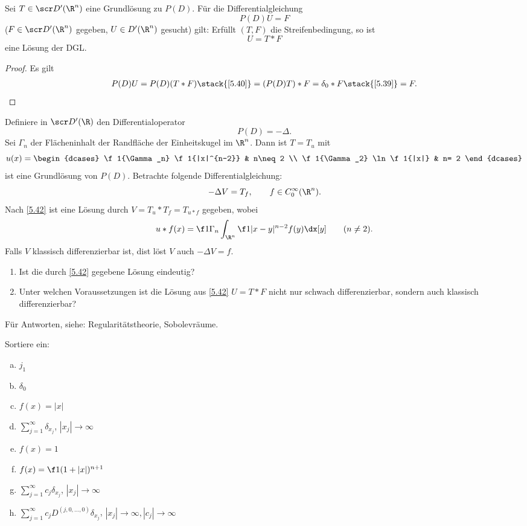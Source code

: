 \begin{st} \label{5.42}
	Sei $T \in \scr D'(\R^n)$ eine Grundlösung zu $P(D)$.
	Für die Differentialgleichung
	\[
		P(D) U = F
	\]
	($F \in \scr D'(\R^n)$ gegeben, $U \in D'(\R^n)$ gesucht)
	gilt:
	Erfüllt $(T,F)$ die Streifenbedingung, so ist
	\[
		U = T \ast F
	\]
	eine Lösung der DGL.
	\begin{proof}
		Es gilt
		\begin{align*}
			P(D) U
			= P(D) (T \ast F)
			\stack{\ref{5.40}}= (P(D) T) \ast F
			= \delta_0 \ast F
			\stack{\ref{5.39}}= F.
		\end{align*}
	\end{proof}
\end{st}

\begin{ex} \label{5.43}
	Definiere in $\scr D'(\R)$ den Differentialoperator
	\[
		P(D) = -\Delta.
	\]
	Sei $\Gamma_n$ der Flächeninhalt der Randfläche der Einheitskugel im $\R^n$.
	Dann ist $T = T_u$ mit
	\[
		u(x) = \begin{dcases}
			\f 1{\Gamma_n} \f 1{|x|^{n-2}} & n\neq 2 \\
			\f 1{\Gamma_2} \ln \f 1{|x|} & n= 2
		\end{dcases}
	\]
	ist eine Grundlösung von $P(D)$.
	Betrachte folgende Differentialgleichung:
	\[
		-\Delta V = T_f,
		\qquad f \in C_0^\infty(\R^n).
	\]
	Nach \ref{5.42} ist eine Lösung durch $V = T_u \ast T_f = T_{u\ast f}$ gegeben, wobei
	\[
		u \ast f(x) = \f 1{\Gamma_n} \int_{\R^n} \f 1{|x-y|^{n-2}} f(y) \dx[y]
		\qquad (n\neq 2).
	\]
	Falls $V$ klassisch differenzierbar ist, dist löst $V$ auch $-\Delta V = f$.
\end{ex}

\begin{nt}
	\begin{enumerate}[1)]
		\item
			Ist die durch \ref{5.42} gegebene Lösung eindeutig?
		\item
			Unter welchen Voraussetzungen ist die Lösung aus \ref{5.42} $U = T \ast F$ nicht nur schwach differenzierbar, sondern auch klassisch differenzierbar?
	\end{enumerate}
	Für Antworten, siehe: Regularitätstheorie, Sobolevräume.
\end{nt}

\begin{nt}[Veranschaulichung]
	\fixme[Schaubild]
	Sortiere ein:
	\begin{enumerate}[a)]
		\item
			$j_1$
		\item
			$\delta_0$
		\item
			$f(x) = |x|$
		\item
			$\sum_{j=1}^\infty \delta_{x_j}$, $|x_j| \to \infty$
		\item
			$f(x) = 1$
		\item
			$f(x) = \f 1{(1+|x|)^{n+1}}$
		\item
			$\sum_{j=1}^\infty c_j \delta_{x_j}$, $|x_j| \to \infty$
		\item
			$\sum_{j=1}^\infty c_j D^{(j,0,\dotsc, 0)} \delta_{x_j}$, $|x_j| \to \infty, |c_j| \to \infty$
	\end{enumerate}
\end{nt}


